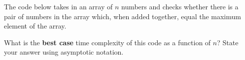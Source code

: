 \begin{prob}
    The code below takes in an array of $n$ numbers and checks whether there is a pair
    of numbers in the array which, when added together, equal the maximum element of the
    array.

    What is the \textbf{best case} time complexity of this code as a function of $n$?
    State your answer using asymptotic notation.

    \inputminted[lastline=8]{python}{\thisdir/code.py}


\end{prob}
